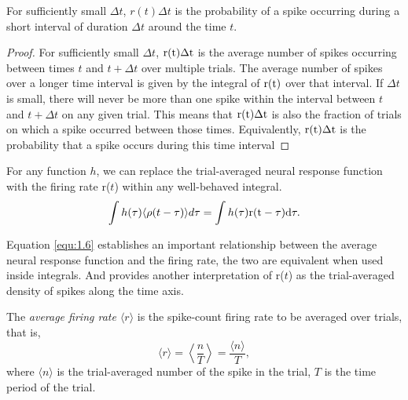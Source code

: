 \begin{prop}
  For sufficiently small $\Delta t$, $r(t)\Delta t$ 
  is the probability of a spike occurring during a short interval of duration $\Delta t$ around the time $t$.
  \begin{proof}
  For sufficiently small $\Delta t$, $\rm{r}(t)\Delta t$ is the average number of spikes occurring
between times $t$ and $t + \Delta t$ over multiple trials. The average number of
spikes over a longer time interval is given by the integral of $\rm{r} ( t )$ over that
interval. If $\Delta t$ is small, there will never be more than one spike within the
interval between $t$ and $t + \Delta t$ on any given trial. This means that $\rm{r}(t)\Delta t$ is
also the fraction of trials on which a spike occurred between those times. Equivalently, $\rm{r}(t)\Delta t$ is the probability that a spike occurs during this time
interval
\end{proof}\qedhere
\end{prop}



\begin{thm}
  \label{thm:equivalence}
  For any function $h$, 
  we can
replace the trial-averaged neural response function with the firing rate r($t$)
within any well-behaved integral.
  \begin{equation}
    \label{equ:1.6}
    \int h(\tau)\langle \rho(t-\tau)\rangle d\tau = \int h(\tau)\rm{r}(t-\tau)d\tau.
  \end{equation}
\end{thm}

\begin{rem}
  Equation \ref{equ:1.6} establishes an important relationship between the
average neural response function and the firing rate, the two are equivalent when used inside 
integrals. And provides another interpretation of
  r($t$) as the trial-averaged density of spikes along the time axis.
\end{rem}

\begin{defn}
  \label{def:averageFiringRate}
  The \emph{average firing rate $\langle r \rangle $} is the spike-count firing rate to be averaged over trials, that is, 
  \begin{equation}
    \label{equ:averageFire}
    \langle r\rangle = \left< \frac{n}{T} \right> =\frac{\langle n\rangle }{T},
  \end{equation}
  where $\langle n \rangle $ is the trial-averaged number of the spike in the trial, 
  $T$ is the time period of the trial.
\end{defn}

